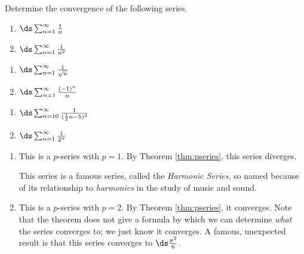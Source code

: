 
\begin{example} \label{eg:7.2.3} %
Determine the convergence of the following series.\\

\noindent\begin{minipage}[t]{.33\linewidth}
\begin{enumerate}
\item		$\ds\sum_{n=1}^\infty \frac{1}{n}$
\item		$\ds\sum_{n=1}^\infty \frac{1}{n^2}$
\end{enumerate}
\end{minipage}
\begin{minipage}[t]{.33\linewidth}
\begin{enumerate}\addtocounter{enumi}{2}
\item		$\ds\sum_{n=1}^\infty \frac{1}{\sqrt{n}}$
\item		$\ds\sum_{n=1}^\infty \frac{(-1)^n}{n}$
\end{enumerate}
\end{minipage}\begin{minipage}[t]{.33\linewidth}
\begin{enumerate}\addtocounter{enumi}{4}
\item		$\ds\sum_{n=10}^\infty \frac{1}{(\frac12n-5)^3}$
\item		$\ds\sum_{n=1}^\infty \frac{1}{2^n}$
\end{enumerate}
\end{minipage} 

\solution
\begin{enumerate}
\item		This is a $p$-series with $p=1$. By Theorem \ref{thm:pseries}, this series diverges. 

This series is a famous series, called the \emph{Harmonic Series}, so named because of its relationship to \emph{harmonics} in the study of music and sound. 

\item		This is a $p$-series with $p=2$. By Theorem \ref{thm:pseries}, it converges. Note that the theorem does not give a formula by which we can determine \emph{what} the series converges to; we just know it converges. A famous, unexpected result is that this series converges to $\ds\frac{\pi^2}{6}$.


\end{enumerate}
\end{example}
